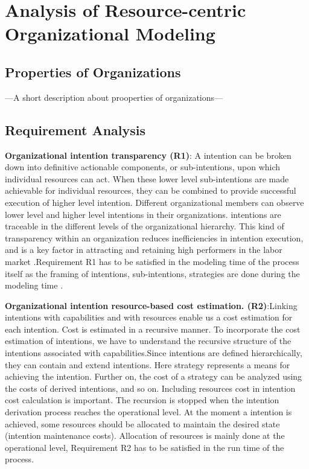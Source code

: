 \chapter{Analysis of Resource-centric Organizational Modeling}
\label{chap:analysis}



\section{Properties of Organizations}
\label{sec:propertiesorganization}
---A short description about prooperties of organizations---


\section{Requirement Analysis}
\label{sec:requirementssupoorting}

 \textbf{Organizational intention transparency (R1)}:  A intention can be broken down into definitive actionable components, or sub-intentions, upon which individual resources can act. When these lower level sub-intentions are made  achievable for individual resources, they can be combined to provide successful execution of higher level intention. Different organizational members can observe lower level and higher level intentions in their organizations. intentions are traceable in the different levels of the organizational hierarchy. This kind of transparency within an organization reduces inefficiencies in intention execution, and is a key factor in attracting and retaining high  performers in the labor market \cite{McManus2007}.Requirement R1 has to be satisfied in the modeling time of the process itself as the framing of intentions, sub-intentions, strategies are done during the modeling time .

 \textbf{Organizational intention resource-based cost estimation. (R2)}:Linking intentions with capabilities and with resources enable us a cost estimation for each intention. Cost is estimated in a recursive manner. To incorporate the cost estimation of intentions, we have to understand the recursive structure of the intentions associated with capabilities.Since intentions are defined hierarchically, they can contain and extend intentions. Here strategy represents a means for achieving the intention. Further on, the cost of a strategy can be analyzed using the costs of derived  intentions, and so on. Including resources cost in intention cost calculation is important. The recursion is stopped when the intention derivation process reaches the operational
level. At the moment a  intention is achieved, some resources should be allocated to maintain the desired state (intention maintenance costs)\cite{Mandic2010}. Allocation of resources is mainly done at the operational level, Requirement R2 has to be satisfied in the run time of the process.

